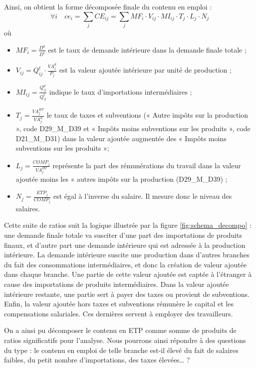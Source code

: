 Ainsi, on obtient la forme décomposée finale du contenu en emploi : 
\begin{equation}
\forall i \quad ce_i = \sum_j CE_{ij} = \sum_j MF_i \cdot V_{ij} \cdot MI_{ij} \cdot T_j \cdot L_j \cdot N_j
\label{decompo_ce}
\end{equation}
où
\begin{itemize}
	\item $MF_i = \frac{D^d}{D^t}$ est le taux de demande intérieure dans la demande finale totale ;
	\item $V_{ij} = Q^t_{ij} \cdot \frac{VA^d_j}{P_j}$ est la valeur ajoutée intérieure par unité de production ;
	\item $MI_{ij} = \frac{Q^d_{ij}}{Q^t_{ij}}$ indique le taux d'importations intermédiaires ;
	\item $T_j = \frac{VA^{HT}_j}{VA^d_j}$ le taux de taxes et subventions (« Autre impôts sur la production », code D29\_M\_D39 et « Impôts moins subventions sur les produits », code D21\_M\_D31) dans la valeur ajoutée augmentée des « Impôts moins subventions sur les produits »;
	\item $L_j = \frac{COMP_j}{VA^{HT}_j}$ représente la part des rémunérations du travail dans la valeur ajoutée moins les « autres impôts sur la production (D29\_M\_D39) ;
	\item $N_j = \frac{ETP_j}{COMP_j}$ est égal à l’inverse du salaire. Il mesure donc le niveau des salaires.
\end{itemize}

Cette suite de ratios suit la logique illustrée par la figure \ref{fig:schema_decompo} : une demande finale totale va susciter d’une part des importations de produits finaux, et d’autre part une demande intérieure qui est adressée à la production intérieure. La demande intérieure suscite une production dans d’autres branches du fait des consommations intermédiaires, et donc la création de valeur ajoutée dans chaque branche. Une partie de cette valeur ajoutée est captée à l’étranger à cause des importations de produits intermédiaires. Dans la valeur ajoutée intérieure restante, une partie sert à payer des taxes ou provient de subventions. Enfin, la valeur ajoutée hors taxes et subventions rémunère le capital et les compensations salariales. Ces dernières servent à employer des travailleurs.

On a ainsi pu décomposer le contenu en ETP comme somme de produits de ratios significatifs pour l’analyse. Nous pourrons ainsi répondre à des questions du type : le contenu en emploi de telle branche est-il élevé du fait de salaires faibles, du petit nombre d’importations, des taxes élevées… ?

